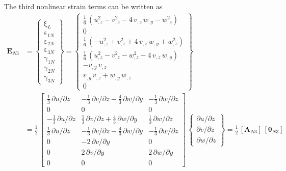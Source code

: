 The third nonlinear strain terms can be written as 
\begin{equation}
\begin{aligned}
\mathbf{E}_{N3} & =  \begin{Bmatrix}
\mathrm \xi_{L} \\
\mathrm \varepsilon_{1N} \\
\mathrm \varepsilon_{2N} \\
\mathrm \varepsilon_{3N} \\
\mathrm \gamma_{1N} \\
\mathrm \gamma_{2N} \\
\mathrm \gamma_{3N} \end{Bmatrix} =
\begin{Bmatrix}
\tfrac{1}{6} \,  \left( u_{,z}^2 - v_{,z}^2 - 4 \, v_{,z} \, w_{,y} - w_{,z}^2   \right)\\
0 \\
\tfrac{1}{6} \,  \left( - u_{,z}^2 + v_{,z}^2 + 4 \, v_{,z} \, w_{,y} + w_{,z}^2  \right) \\
\tfrac{1}{6} \,  \left( u_{,z}^2 - v_{,z}^2 - w_{,z}^2 - 4 \, v_{,z} \, w_{,y}\right) \\ 
- v_{,y} \, v_{,z}  \\
v_{,y} \, v_{,z} + w_{,y} \, w_{,z} \\ 
0 \end{Bmatrix} \\
& = \frac{1}{2} \, \begin{bmatrix}
\tfrac{1}{3} \, \partial u / \partial z &  - \tfrac{1}{3} \, \partial v / \partial z - \tfrac{4}{3} \, \partial w / \partial y & - \tfrac{1}{3} \, \partial w / \partial z   \\
0 &  0 & 0  \\
- \tfrac{1}{3} \, \partial u / \partial z &  \tfrac{1}{3} \, \partial v / \partial z + \tfrac{4}{3} \, \partial w / \partial y & \tfrac{1}{3} \, \partial w / \partial z \\
\tfrac{1}{3} \, \partial u / \partial z &  - \tfrac{1}{3} \, \partial v / \partial z - \tfrac{4}{3} \, \partial w / \partial y & - \tfrac{1}{3} \, \partial w / \partial z \\
0 &  -2 \, \partial v / \partial y & 0  \\
0 &  2 \, \partial v / \partial y & 2 \, \partial w / \partial y  \\
0 &  0 &  0  \end{bmatrix} \, \begin{Bmatrix}
\partial u / \partial z\\
\partial v / \partial z \\
\partial w / \partial z
\end{Bmatrix}
= \tfrac{1}{2} \, [\mathbf{A}_{N3}] \, [\boldsymbol{\theta}_{N3}]
\end{aligned}
\end{equation}
